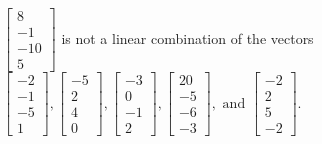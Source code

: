 \begin{exercise}
\begin{exerciseStatement}
  \end{exerciseStatement}
  \begin{exerciseAnswer}
   \(\left[\begin{array}{c}
8 \\
-1 \\
-10 \\
5
\end{array}\right]\) 
  	 is not  
	a linear combination of the vectors \(\left[\begin{array}{c}
-2 \\
-1 \\
-5 \\
1
\end{array}\right] , \left[\begin{array}{c}
-5 \\
2 \\
4 \\
0
\end{array}\right] , \left[\begin{array}{c}
-3 \\
0 \\
-1 \\
2
\end{array}\right] , \left[\begin{array}{c}
20 \\
-5 \\
-6 \\
-3
\end{array}\right] , \text{ and } \left[\begin{array}{c}
-2 \\
2 \\
5 \\
-2
\end{array}\right]\).

	
  


  \end{exerciseAnswer}
\end{exercise}
